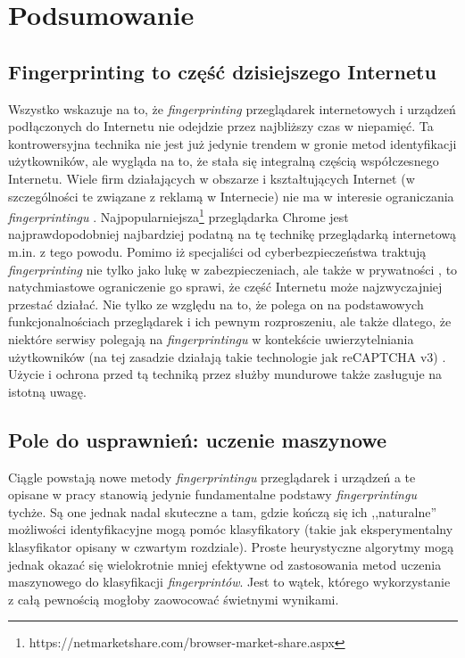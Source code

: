 \chapter*{Podsumowanie}

\section*{Fingerprinting to część dzisiejszego Internetu}
Wszystko wskazuje na to, że \emph{fingerprinting} przeglądarek internetowych i
urządzeń podłączonych do Internetu nie odejdzie przez najbliższy czas w
niepamięć. Ta kontrowersyjna technika nie jest już jedynie trendem w gronie
metod identyfikacji użytkowników, ale wygląda na to, że stała się integralną
częścią współczesnego Internetu. Wiele firm działających w obszarze i
kształtujących Internet (w szczególności te związane z reklamą w Internecie) nie
ma w interesie ograniczania \emph{fingerprintingu} \cite{al2018beyond}.
Najpopularniejsza\footnote{https://netmarketshare.com/browser-market-share.aspx}
przeglądarka Chrome jest najprawdopodobniej najbardziej podatną \cite{al2017not}
na tę technikę przeglądarką internetową m.in. z tego powodu. Pomimo iż
specjaliści od cyberbezpieczeństwa traktują \emph{fingerprinting} nie tylko jako
lukę w zabezpieczeniach, ale także w prywatności
\cite{mowery2012pixel,al2020too}, to natychmiastowe ograniczenie go sprawi, że
część Internetu może najzwyczajniej przestać działać. Nie tylko ze względu na
to, że polega on na podstawowych funkcjonalnościach przeglądarek i ich pewnym
rozproszeniu, ale także dlatego, że niektóre serwisy polegają na
\emph{fingerprintingu} w kontekście uwierzytelniania użytkowników (na tej
zasadzie działają takie technologie jak reCAPTCHA v3) \cite{45581}. Użycie i
ochrona przed tą techniką przez służby mundurowe także zasługuje na istotną
uwagę.

\section*{Pole do usprawnień: uczenie maszynowe}
Ciągle powstają nowe metody \emph{fingerprintingu} przeglądarek i urządzeń a te
opisane w pracy stanowią jedynie fundamentalne podstawy \emph{fingerprintingu}
tychże. Są one jednak nadal skuteczne a tam, gdzie kończą się ich ,,naturalne''
możliwości identyfikacyjne mogą pomóc klasyfikatory (takie jak eksperymentalny
klasyfikator opisany w czwartym rozdziale). Proste heurystyczne algorytmy mogą
jednak okazać się wielokrotnie mniej efektywne od zastosowania metod uczenia
maszynowego do klasyfikacji \emph{fingerprintów}. Jest to wątek, którego
wykorzystanie z całą pewnością mogłoby zaowocować świetnymi wynikami.

